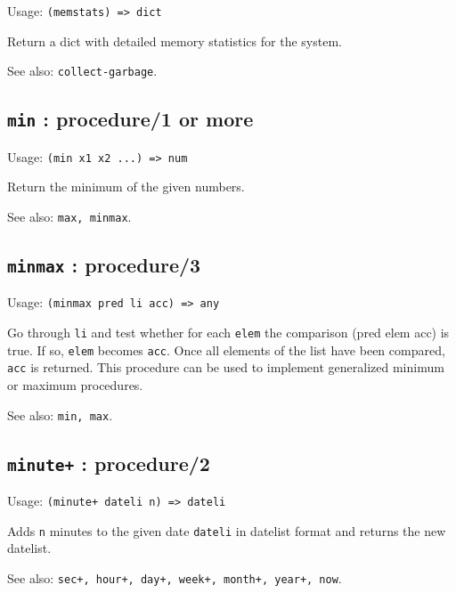 \documentclass[
]{article}
\newcommand{\passthrough}[1]{#1}
\begin{document}
Usage: \passthrough{\lstinline!(memstats) => dict!}

Return a dict with detailed memory statistics for the system.

See also: \passthrough{\lstinline!collect-garbage!}.

\hypertarget{min-procedure1-or-more-1}{%
\subsection{\texorpdfstring{\texttt{min} : procedure/1 or
more}{min : procedure/1 or more}}\label{min-procedure1-or-more-1}}

Usage: \passthrough{\lstinline!(min x1 x2 ...) => num!}

Return the minimum of the given numbers.

See also: \passthrough{\lstinline!max, minmax!}.

\hypertarget{minmax-procedure3-1}{%
\subsection{\texorpdfstring{\texttt{minmax} :
procedure/3}{minmax : procedure/3}}\label{minmax-procedure3-1}}

Usage: \passthrough{\lstinline!(minmax pred li acc) => any!}

Go through \passthrough{\lstinline!li!} and test whether for each
\passthrough{\lstinline!elem!} the comparison (pred elem acc) is true.
If so, \passthrough{\lstinline!elem!} becomes
\passthrough{\lstinline!acc!}. Once all elements of the list have been
compared, \passthrough{\lstinline!acc!} is returned. This procedure can
be used to implement generalized minimum or maximum procedures.

See also: \passthrough{\lstinline!min, max!}.

\hypertarget{minute-procedure2-1}{%
\subsection{\texorpdfstring{\texttt{minute+} :
procedure/2}{minute+ : procedure/2}}\label{minute-procedure2-1}}

Usage: \passthrough{\lstinline!(minute+ dateli n) => dateli!}

Adds \passthrough{\lstinline!n!} minutes to the given date
\passthrough{\lstinline!dateli!} in datelist format and returns the new
datelist.

See also:
\passthrough{\lstinline!sec+, hour+, day+, week+, month+, year+, now!}.
\end{document}
